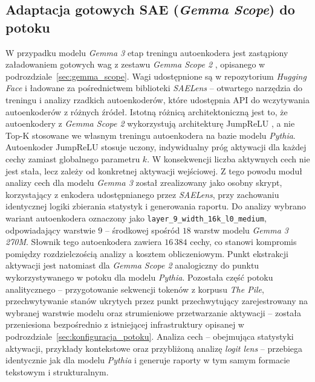   \subsection{Adaptacja gotowych SAE (\textit{Gemma Scope}) do potoku}
  \label{sec:adaptacja_gemma_scope}
  W przypadku modelu \textit{Gemma 3} etap treningu autoenkodera jest zastąpiony załadowaniem gotowych wag z zestawu \textit{Gemma Scope 2} \cite{gemma_scope_2_2025}, opisanego w podrozdziale~\ref{sec:gemma_scope}. Wagi udostępnione są w repozytorium \textit{Hugging Face} i ładowane za pośrednictwem biblioteki \textit{SAELens} \cite{bloom_2024_sae_training_codebase} -- otwartego narzędzia do treningu i analizy rzadkich autoenkoderów, które udostępnia API do wczytywania autoenkoderów z różnych źródeł. \newline
  Istotną różnicą architektoniczną jest to, że autoenkodery z \textit{Gemma Scope 2} wykorzystują architekturę JumpReLU \cite{rajamanoharan_2024b_jumprelu_sparse_autoencoders}, a nie Top-K stosowane we własnym treningu autoenkodera na bazie modelu \textit{Pythia}. Autoenkoder JumpReLU stosuje uczony, indywidualny próg aktywacji dla każdej cechy zamiast globalnego parametru $k$. W konsekwencji liczba aktywnych cech nie jest stała, lecz zależy od konkretnej aktywacji wejściowej. Z tego powodu moduł analizy cech dla modelu \textit{Gemma 3} został zrealizowany jako osobny skrypt, korzystający z enkodera udostępnianego przez \textit{SAELens}, przy zachowaniu identycznej logiki zbierania statystyk i generowania raportu. \newline
  Do analizy wybrano wariant autoenkodera oznaczony jako \texttt{layer\_9\_width\_16k\_l0\_medium}, odpowiadający warstwie $9$ -- środkowej spośród $18$ warstw modelu \textit{Gemma 3 270M}. Słownik tego autoenkodera zawiera $16\,384$ cechy, co stanowi kompromis pomiędzy rozdzielczością analizy a kosztem obliczeniowym. Punkt ekstrakcji aktywacji jest natomiast dla \textit{Gemma Scope 2} analogiczny do punktu wykorzystywanego w potoku dla modelu \textit{Pythia}. \newline
  Pozostała część potoku analitycznego -- przygotowanie sekwencji tokenów z korpusu \textit{The Pile}, przechwytywanie stanów ukrytych przez punkt przechwytujący zarejestrowany na wybranej warstwie modelu oraz strumieniowe przetwarzanie aktywacji -- została przeniesiona bezpośrednio z istniejącej infrastruktury opisanej w podrozdziale~\ref{sec:konfiguracja_potoku}. Analiza cech -- obejmująca statystyki aktywacji, przykłady kontekstowe oraz przybliżoną analizę \textit{logit lens} -- przebiega identycznie jak dla modelu \textit{Pythia} i generuje raporty w tym samym formacie tekstowym i strukturalnym.

